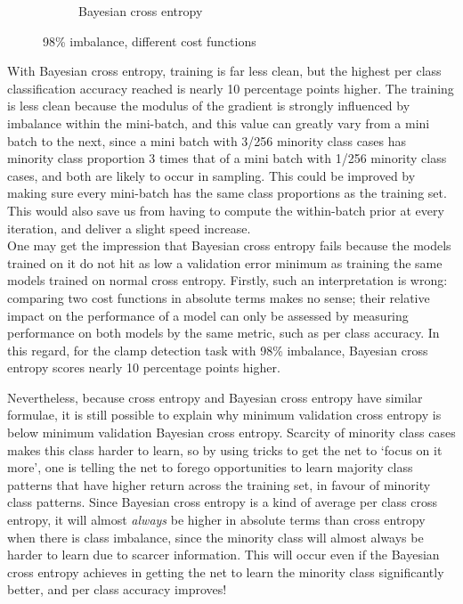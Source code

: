 \documentclass[a4paper,11pt]{article}
\begin{document}
\begin{figure}
\begin{minipage}[b]{\textwidth}
\begin{subfigure}{.5\textwidth}
        \caption{Bayesian cross entropy}\label{fig:2b}
      \end{subfigure} \par \vspace*{20pt} %
      \caption{98\% imbalance, different cost functions}\label{fig:2}
    \end{minipage}%
    \label{f53}
\end{figure}

With Bayesian cross entropy, training is far less clean, but the highest per class classification accuracy reached is nearly 10 percentage points higher. The training is less clean because the modulus of the gradient is strongly influenced by imbalance within the mini-batch, and this value can greatly vary from a mini batch to the next, since a mini batch with 3/256 minority class cases has minority class proportion 3 times that of a mini batch with 1/256 minority class cases, and both are likely to occur in sampling. This could be improved by making sure every mini-batch has the same class proportions as the training set. This would also save us from having to compute the within-batch prior at every iteration, and deliver a slight speed increase.  \\

One may get the impression that Bayesian cross entropy fails because the models trained on it do not hit as low a validation error minimum as training the same models trained on normal cross entropy. Firstly, such an interpretation is wrong: comparing two cost functions in absolute terms makes no sense; their relative impact on the performance of a model can only be assessed by measuring performance on both models by the same metric, such as per class accuracy. In this regard, for the clamp detection task with 98\% imbalance, Bayesian cross entropy scores nearly 10 percentage points higher.

Nevertheless, because cross entropy and Bayesian cross entropy have similar formulae, it is still possible to explain why minimum validation cross entropy is below minimum validation Bayesian cross entropy. Scarcity of minority class cases makes this class harder to learn, so by using tricks to get the net to `focus on it more', one is telling the net to forego opportunities to learn majority class patterns that have higher return across the training set, in favour of minority class patterns. Since Bayesian cross entropy is a kind of average per class cross entropy, it will almost \textit{always} be higher in absolute terms than cross entropy when there is class imbalance, since the minority class will almost always be harder to learn due to scarcer information. This will occur even if the Bayesian cross entropy achieves in getting the net to learn the minority class significantly better, and per class accuracy improves! 
\end{document}
